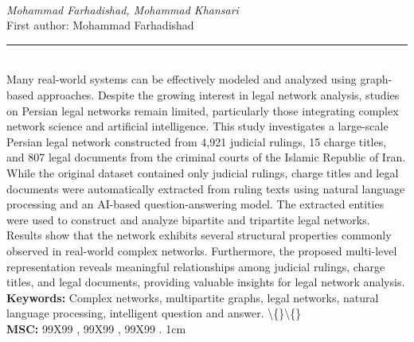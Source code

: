 \documentclass[10pt,twoside]{article}
\begin{document}
\noindent\begin{minipage}[t][\textheight]{\textwidth}
\\[0.35em]
{\itshape Mohammad Farhadishad, Mohammad Khansari}\\[0.2em]
{\footnotesize First author: Mohammad Farhadishad}\\[0.45em]
\noindent\rule{\textwidth}{0.3pt}\\[0.4em]
{\footnotesize  Many real-world systems can be effectively modeled and analyzed using graph-based approaches. Despite the growing interest in legal network analysis, studies on Persian legal networks remain limited, particularly those integrating complex network science and artificial intelligence. This study investigates a large-scale Persian legal network constructed from 4,921 judicial rulings, 15 charge titles, and 807 legal documents from the criminal courts of the Islamic Republic of Iran. While the original dataset contained only judicial rulings, charge titles and legal documents were automatically extracted from ruling texts using natural language processing and an AI-based question-answering model. The extracted entities were used to construct and analyze bipartite and tripartite legal networks. Results show that the network exhibits several structural properties commonly observed in real-world complex networks. Furthermore, the proposed multi-level representation reveals meaningful relationships among judicial rulings, charge titles, and legal documents, providing valuable insights for legal network analysis.}\\[0.4em]
{\footnotesize\bfseries Keywords:} {\footnotesize Complex networks, multipartite graphs, legal networks, natural language processing, intelligent question and answer. \textbackslash\{\}\textbackslash\{\}}\\[0.15em]
{\footnotesize\bfseries MSC:} {\footnotesize 99X99 , 99X99 , 99X99 . 1cm}\\
\vfill
\end{minipage}
\newpage
\end{document}
